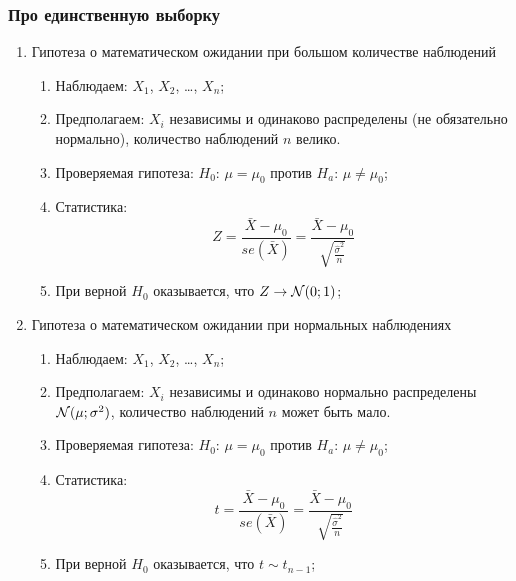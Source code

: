 \documentclass[12pt, a4paper]{article}
\begin{document}
\subsubsection{Про единственную выборку}

\begin{enumerate}

  \item Гипотеза о математическом ожидании при большом количестве наблюдений
    \begin{enumerate}

      \item Наблюдаем: $X_1$, $X_2$, \ldots, $X_n$;

      \item Предполагаем: $X_i$ независимы и одинаково распределены (не обязательно нормально), количество наблюдений $n$ велико.

      \item Проверяемая гипотеза: $H_0$: $\mu = \mu_0$ против $H_a$: $\mu \neq \mu_0$;

      \item Статистика:
	\[
	  Z = \frac{\bar X - \mu_0}{se(\bar X)} = \frac{\bar X - \mu_0}{\sqrt{\frac{\hat \sigma^2}{n}}}
	\]

      \item При верной $H_0$ оказывается, что $Z \to \mathcal{N}(0;1)$;
    \end{enumerate}

  \item Гипотеза о математическом ожидании при нормальных наблюдениях
    \begin{enumerate}

      \item Наблюдаем: $X_1$, $X_2$, \ldots, $X_n$;

      \item Предполагаем: $X_i$ независимы и одинаково нормально распределены $\mathcal{N}(\mu; \sigma^2)$, количество наблюдений $n$ может быть мало.

      \item Проверяемая гипотеза: $H_0$: $\mu = \mu_0$ против $H_a$: $\mu \neq \mu_0$;

      \item Статистика:
	\[
	  t = \frac{\bar X - \mu_0}{se(\bar X)} = \frac{\bar X - \mu_0}{\sqrt{\frac{\hat \sigma^2}{n}}}
	\]

      \item При верной $H_0$ оказывается, что $t \sim t_{n-1}$;
    \end{enumerate}



\end{enumerate}
\end{document}
